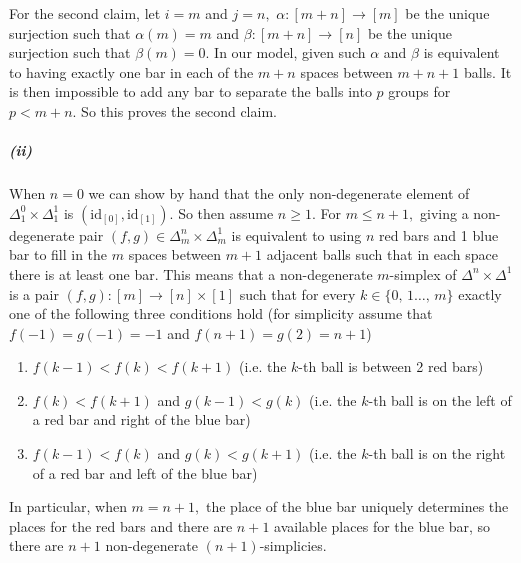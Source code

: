 \documentclass{article}
\begin{document}
For the second claim, let $i=m$ and $j=n,$ $\alpha\colon[m+n]\rightarrow[m]$ be the unique surjection such that $\alpha(m)=m$ and $\beta\colon[m+n]\rightarrow[n]$ be the unique surjection such that $\beta(m)=0$. In our model, given such $\alpha$ and $\beta$ is equivalent to having exactly one bar in each of the $m+n$ spaces between $m+n+1$ balls. It is then impossible to add any bar to separate the balls into $p$ groups for $p<m+n.$ So this proves the second claim.

\subparagraph{(ii)}When $n=0$ we can show by hand that the only non-degenerate element of $\Delta^0_1\times\Delta^1_1$ is $(\text{id}_{[0]},\text{id}_{[1]}).$ So then assume $n\geq1.$ For $m\leq n+1,$ giving a non-degenerate pair $(f,g)\in\Delta^n_m\times\Delta^1_m$ is equivalent to using $n$ red bars and 1 blue bar to fill in the $m$ spaces between $m+1$ adjacent balls such that in each space there is at least one bar. This means that a non-degenerate $m$-simplex of $\Delta^n\times\Delta^1$ is a pair $(f,g)\colon[m]\rightarrow[n]\times[1]$ such that for every $k\in\{0,\,1\ldots,\,m\}$ exactly one of the following three conditions hold (for simplicity assume that $f(-1)=g(-1)=-1$ and $f(n+1)=g(2)=n+1$)
\begin{enumerate}
  \item $f(k-1)<f(k)<f(k+1)$ (i.e. the $k$-th ball is between 2 red bars)
  \item $f(k)<f(k+1)$ and $g(k-1)<g(k)$ (i.e. the $k$-th ball is on the left of a red bar and right of the blue bar)
  \item $f(k-1)<f(k)$ and $g(k)<g(k+1)$ (i.e. the $k$-th ball is on the right of a red bar and left of the blue bar)
\end{enumerate}

In particular, when $m=n+1,$ the place of the blue bar uniquely determines the places for the red bars and there are $n+1$ available places for the blue bar, so there are $n+1$ non-degenerate $(n+1)$-simplicies. 
\end{document}
